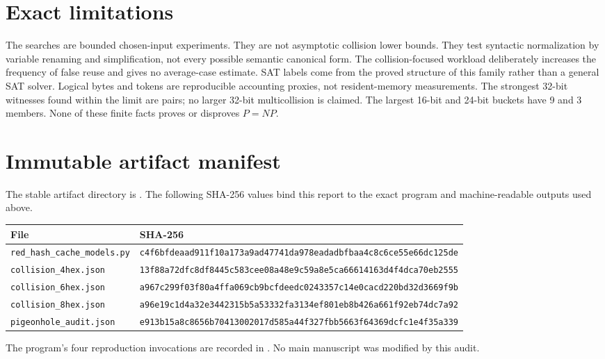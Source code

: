 \documentclass[11pt]{article}
\begin{document}
\section{Exact limitations}

The searches are bounded chosen-input experiments.  They are not asymptotic
collision lower bounds.  They test syntactic normalization by variable
renaming and simplification, not every possible semantic canonical form.  The
collision-focused workload deliberately increases the frequency of false
reuse and gives no average-case estimate.  SAT labels come from the proved
structure of this family rather than a general SAT solver.  Logical bytes and
tokens are reproducible accounting proxies, not resident-memory measurements.
The strongest 32-bit witnesses found within the limit are pairs; no larger
32-bit multicollision is claimed.  The largest 16-bit and 24-bit buckets have
9 and 3 members.  None of these finite facts proves or disproves $P=NP$.

\section{Immutable artifact manifest}

The stable artifact directory is
.  The following SHA-256 values bind
this report to the exact program and machine-readable outputs used above.

\begin{center}
\scriptsize
\begin{tabular}{@{}p{}p{}@{}}
\toprule
File & SHA-256\\
\midrule
\texttt{red\_hash\_cache\_models.py} &
\texttt{c4f6bfdeaad911f10a173a9ad47741da978eadadbfbaa4c8c6ce55e66dc125de}\\
\texttt{collision\_4hex.json} &
\texttt{13f88a72dfc8df8445c583cee08a48e9c59a8e5ca66614163d4f4dca70eb2555}\\
\texttt{collision\_6hex.json} &
\texttt{a967c299f03f80a4ffa069cb9bcfdeedc0243357c14e0cacd220bd32d3669f9b}\\
\texttt{collision\_8hex.json} &
\texttt{a96e19c1d4a32e3442315b5a53332fa3134ef801eb8b426a661f92eb74dc7a92}\\
\texttt{pigeonhole\_audit.json} &
\texttt{e913b15a8c8656b70413002017d585a44f327fbb5663f64369dcfc1e4f35a339}\\
\bottomrule
\end{tabular}
\end{center}

The program's four reproduction invocations are recorded in
.  No main manuscript was
modified by this audit.
\end{document}
